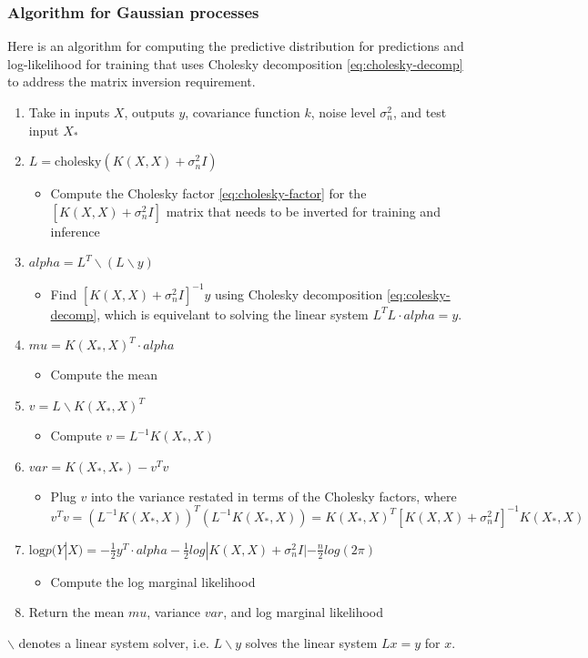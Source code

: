 \subsubsection{Algorithm for Gaussian processes}
Here is an algorithm for computing the predictive distribution for predictions and log-likelihood for training that uses Cholesky decomposition \ref{eq:cholesky-decomp} to address the matrix inversion requirement.
\begin{enumerate}
    \item Take in inputs $X$, outputs $y$, covariance function $k$, noise level $\sigma^2_n$, and test input $X_*$
    \item $L = \text{cholesky}(K(X,X) + \sigma_n^2I)$
    \begin{itemize}
        \item Compute the Cholesky factor \ref{eq:cholesky-factor} for the $[K(X,X) + \sigma^2_nI]$ matrix that needs to be inverted for training and inference
    \end{itemize}
    \item $alpha = L^T \backslash (L \backslash y)$
    \begin{itemize}
        \item Find $[K(X,X) + \sigma^2_nI]^{-1}y$ using Cholesky decomposition \ref{eq:colesky-decomp}, which is equivelant to solving the linear system $L^T L \cdot alpha = y$.
    \end{itemize}
    \item $mu = K(X_*, X)^T \cdot alpha$
    \begin{itemize}
        \item Compute the mean
    \end{itemize}
    \item $v = L \backslash K(X_*, X)^T$
    \begin{itemize}
        \item Compute $v = L^{-1} K(X_*, X)$ 
    \end{itemize}
    \item $var = K(X_*, X_*) - v^T v$
    \begin{itemize}
        \item Plug $v$ into the variance restated in terms of the Cholesky factors, where $v^T v = (L^{-1} K(X_*, X))^T (L^{-1} K(X_*, X)) = K(X_*, X)^T [K(X,X) + \sigma^2_nI]^{-1} K(X_*, X)$ 
    \end{itemize}
    \item $\text{log} p(Y|X) = -\frac{1}{2}y^T \cdot alpha - \frac{1}{2}log|K(X,X) + \sigma^2_nI| - \frac{n}{2}log(2\pi)$
    \begin{itemize}
        \item Compute the log marginal likelihood 
    \end{itemize}
    \item Return the mean $mu$, variance $var$, and log marginal likelihood
\end{enumerate}
$\backslash$ denotes a linear system solver, i.e. $L \backslash y$ solves the linear system $Lx = y$ for $x$. 


